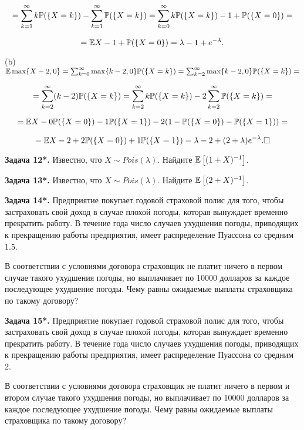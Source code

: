 \[=\sum _{k=1}^{\infty }k{\rm {\mathbb P}}(\{ X=k\} ) -\sum _{k=1}^{\infty }{\rm {\mathbb P}}(\{ X=k\} ) =\sum _{k=0}^{\infty }k{\rm {\mathbb P}}(\{ X=k\} ) -1+{\rm {\mathbb P}}(\{ X=0\} )=\] 

\[={\rm {\mathbb E}}X-1+{\rm {\mathbb P}}(\{ X=0\} )=\lambda -1+e^{-\lambda } .\] 

(b) ${\rm {\mathbb E}}\max \{ X-2,0\} =\sum _{k=0}^{\infty }\max \{ k-2,0\} {\rm {\mathbb P}}(\{ X=k\} ) =\sum _{k=2}^{\infty }\max \{ k-2,0\} {\rm {\mathbb P}}(\{ X=k\} ) =$

\[=\sum _{k=2}^{\infty }(k-2){\rm {\mathbb P}}(\{ X=k\} ) =\sum _{k=2}^{\infty }k{\rm {\mathbb P}}(\{ X=k\} ) -2\sum _{k=2}^{\infty }{\rm {\mathbb P}}(\{ X=k\} ) =\] 

\[={\rm {\mathbb E}}X-0{\rm {\mathbb P}}(\{ X=0\} )-1{\rm {\mathbb P}}(\{ X=1\} )-2(1-{\rm {\mathbb P}}(\{ X=0\} )-{\rm {\mathbb P}}(\{ X=1\} ))=\] 

\[={\rm {\mathbb E}}X-2+2{\rm {\mathbb P}}(\{ X=0\} )+1{\rm {\mathbb P}}(\{ X=1\} )=\lambda -2+(2+\lambda )e^{-\lambda } . \square \] 

\textbf{Задача 12*.} Известно, что $X\sim Pois(\lambda )$. Найдите ${\rm {\mathbb E}}\left[(1+X)^{-1} \right]$.

\textbf{Задача 13*.} Известно, что $X\sim Pois(\lambda )$. Найдите ${\rm {\mathbb E}}\left[(2+X)^{-1} \right]$.

\textbf{Задача 14*.} Предприятие покупает годовой страховой полис для того, чтобы застраховать свой доход в случае плохой погоды, которая вынуждает временно прекратить работу. В течение года число случаев ухудшения погоды, приводящих к прекращению работы предприятия, имеет распределение Пуассона со средним 1.5.

В соответствии с условиями договора страховщик не платит ничего в первом случае такого ухудшения погоды, но выплачивает по 10000 долларов за каждое последующее ухудшение погоды. Чему равны ожидаемые выплаты страховщика по такому договору?

\textbf{Задача 15*. }Предприятие покупает годовой страховой полис для того, чтобы застраховать свой доход в случае плохой погоды, которая вынуждает временно прекратить работу. В течение года число случаев ухудшения погоды, приводящих к прекращению работы предприятия, имеет распределение Пуассона со средним 2.

В соответствии с условиями договора страховщик не платит ничего в первом и втором случае такого ухудшения погоды, но выплачивает по 10000 долларов за каждое последующее ухудшение погоды. Чему равны ожидаемые выплаты страховщика по такому договору?

